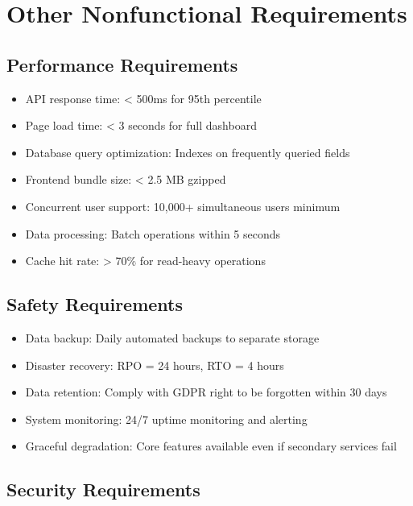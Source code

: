 \documentclass[12pt,a4paper]{article}
\begin{document}
\newpage
\section{Other Nonfunctional Requirements}

\subsection{Performance Requirements}

\begin{itemize}
    \item API response time: < 500ms for 95th percentile
    \item Page load time: < 3 seconds for full dashboard
    \item Database query optimization: Indexes on frequently queried fields
    \item Frontend bundle size: < 2.5 MB gzipped
    \item Concurrent user support: 10,000+ simultaneous users minimum
    \item Data processing: Batch operations within 5 seconds
    \item Cache hit rate: > 70\% for read-heavy operations
\end{itemize}

\subsection{Safety Requirements}
\begin{itemize}
    \item Data backup: Daily automated backups to separate storage
    \item Disaster recovery: RPO = 24 hours, RTO = 4 hours
    \item Data retention: Comply with GDPR right to be forgotten within 30 days
    \item System monitoring: 24/7 uptime monitoring and alerting
    \item Graceful degradation: Core features available even if secondary services fail
\end{itemize}

\subsection{Security Requirements}
\end{document}
